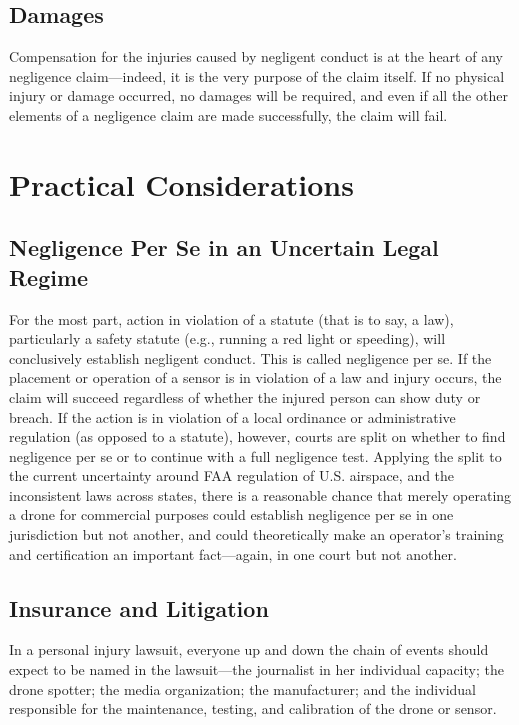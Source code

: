 \begin{itemize}
\begin{itemized}
\subsection{Damages}
Compensation for the injuries caused by negligent conduct is at the heart
of any negligence claim—indeed, it is the very purpose of the claim itself.
If no physical injury or damage occurred, no damages will be required, and
even if all the other elements of a negligence claim are made successfully,
the claim will fail.

\section{Practical Considerations}
\subsection{Negligence Per Se in an Uncertain Legal Regime}

For the most part, action in violation of a statute (that is to say, a law), particularly
a safety statute (e.g., running a red light or speeding), will conclusively
establish negligent conduct. This is called negligence per se. If the
placement or operation of a sensor is in violation of a law and injury occurs,
the claim will succeed regardless of whether the injured person can show
duty or breach. If the action is in violation of a local ordinance or administrative
regulation (as opposed to a statute), however, courts are split on
whether to find negligence per se or to continue with a full negligence test.
Applying the split to the current uncertainty around FAA regulation of U.S.
airspace, and the inconsistent laws across states, there is a reasonable chance
that merely operating a drone for commercial purposes could establish negligence
per se in one jurisdiction but not another, and could theoretically
make an operator's training and certification an important fact—again, in
one court but not another.

\subsection{Insurance and Litigation}
In a personal injury lawsuit, everyone up and down the chain of events
should expect to be named in the lawsuit—the journalist in her individual
capacity; the drone spotter; the media organization; the manufacturer; and
the individual responsible for the maintenance, testing, and calibration of
the drone or sensor.


\end{itemized}
\end{itemize}
